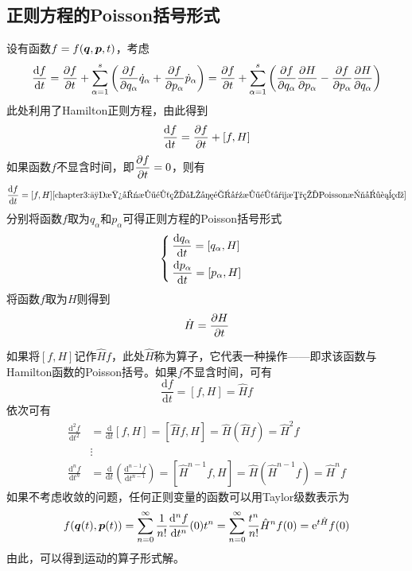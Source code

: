 \subsection{正则方程的Poisson括号形式}

设有函数$f = f(\boldsymbol{q},\boldsymbol{p},t)$，考虑
\begin{equation}
	\frac{\mathrm{d} f}{\mathrm{d} t} = \frac{\partial f}{\partial t} + \sum_{\alpha=1}^s \left(\frac{\partial f}{\partial q_\alpha} \dot{q}_\alpha + \frac{\partial f}{\partial p_\alpha} \dot{p}_\alpha\right) = \frac{\partial f}{\partial t} + \sum_{\alpha=1}^s \left(\frac{\partial f}{\partial q_\alpha} \frac{\partial H}{\partial p_\alpha} - \frac{\partial f}{\partial p_\alpha} \frac{\partial H}{\partial q_\alpha}\right)
\end{equation}
此处利用了Hamilton正则方程，由此得到
\begin{equation}
	\frac{\mathrm{d} f}{\mathrm{d} t} = \frac{\partial f}{\partial t} + [f,H]
\end{equation}
如果函数$f$不显含时间，即$\dfrac{\partial f}{\partial t} = 0$，则有
\begin{equation}
	\frac{\mathrm{d} f}{\mathrm{d} t} = [f,H]
	\eqref{chapter3:不显含时间的力学量对时间导数的Poisson括号表示}
\end{equation}
分别将函数$f$取为$q_\alpha$和$p_\alpha$可得{\heiti 正则方程的Poisson括号形式}
\begin{equation}
	\begin{cases}
		\dfrac{\mathrm{d} q_\alpha}{\mathrm{d} t} = [q_\alpha,H] \\[1.5ex]
		\dfrac{\mathrm{d} p_\alpha}{\mathrm{d} t} = [p_\alpha,H]
	\end{cases}
\end{equation}
将函数$f$取为$H$则得到
\begin{equation}
	\dot{H} = \frac{\partial H}{\partial t}
\end{equation}

如果将$[f,H]$记作$\hat{H} f$，此处$\hat{H}$称为{\heiti 算子}，它代表一种操作——即求该函数与Hamilton函数的Poisson括号。如果$f$不显含时间，可有
\begin{equation*}
	\frac{\mathrm{d} f}{\mathrm{d} t} = [f,H] = \hat{H}f
\end{equation*}
依次可有
\begin{align*}
	\frac{\mathrm{d}^2 f}{\mathrm{d} t^2} & = \frac{\mathrm{d}}{\mathrm{d} t}[f,H] = [\hat{H}f,H] = \hat{H} (\hat{H} f) = \hat{H}^2 f \\
	& \vdots \\
	\frac{\mathrm{d}^n f}{\mathrm{d} t^n} & = \frac{\mathrm{d}}{\mathrm{d} t}\left(\frac{\mathrm{d}^{n-1}f}{\mathrm{d} t^{n-1}}\right) = [\hat{H}^{n-1}f,H] = \hat{H} (\hat{H}^{n-1} f) = \hat{H}^n f
\end{align*}
如果不考虑收敛的问题，任何正则变量的函数可以用Taylor级数表示为
\begin{align*}
	f(\boldsymbol{q}(t),\boldsymbol{p}(t)) = \sum_{n=0}^\infty \frac{1}{n!} \frac{\mathrm{d}^n f}{\mathrm{d} t^n}(0) t^n = \sum_{n=0}^\infty \frac{t^n}{n!} \hat{H}^n f(0) = \mathrm{e}^{t\hat{H}} f(0)
\end{align*}
由此，可以得到运动的算子形式解。

